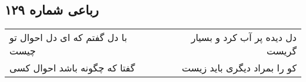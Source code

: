 \begin{center}
\section*{رباعی شماره ۱۲۹}
\label{sec:sh129}
\begin{longtable}{l p{0.5cm} r}
با دل گفتم که ای دل احوال تو چیست
&&
دل دیده پر آب کرد و بسیار گریست
\\
گفتا که چگونه باشد احوال کسی
&&
کو را بمراد دیگری باید زیست
\\
\end{longtable}
\end{center}
